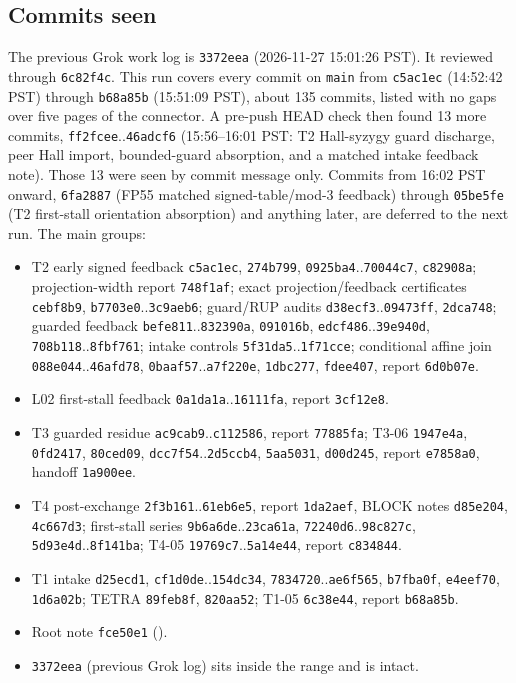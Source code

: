 \documentclass[11pt]{article}
\theoremstyle{definition}
\begin{document}
\subsection*{Commits seen}
The previous Grok work log is \texttt{3372eea} (2026-11-27 15:01:26 PST). It reviewed through \texttt{6c82f4c}. This run covers every commit on \texttt{main} from \texttt{c5ac1ec} (14:52:42 PST) through \texttt{b68a85b} (15:51:09 PST), about 135 commits, listed with no gaps over five pages of the connector. A pre-push HEAD check then found 13 more commits, \texttt{ff2fcee}..\texttt{46adcf6} (15:56--16:01 PST: T2 Hall-syzygy guard discharge, peer Hall import, bounded-guard absorption, and a matched intake feedback note). Those 13 were seen by commit message only. Commits from 16:02 PST onward, \texttt{6fa2887} (FP55 matched signed-table/mod-3 feedback) through \texttt{05be5fe} (T2 first-stall orientation absorption) and anything later, are deferred to the next run. The main groups:
\begin{itemize}
\item T2 early signed feedback \texttt{c5ac1ec}, \texttt{274b799}, \texttt{0925ba4}..\texttt{70044c7}, \texttt{c82908a}; projection-width report \texttt{748f1af}; exact projection/feedback certificates \texttt{cebf8b9}, \texttt{b7703e0}..\texttt{3c9aeb6}; guard/RUP audits \texttt{d38ecf3}..\texttt{09473ff}, \texttt{2dca748}; guarded feedback \texttt{befe811}..\texttt{832390a}, \texttt{091016b}, \texttt{edcf486}..\texttt{39e940d}, \texttt{708b118}..\texttt{8fbf761}; intake controls \texttt{5f31da5}..\texttt{1f71cce}; conditional affine join \texttt{088e044}..\texttt{46afd78}, \texttt{0baaf57}..\texttt{a7f220e}, \texttt{1dbc277}, \texttt{fdee407}, report \texttt{6d0b07e}.
\item L02 first-stall feedback \texttt{0a1da1a}..\texttt{16111fa}, report \texttt{3cf12e8}.
\item T3 guarded residue \texttt{ac9cab9}..\texttt{c112586}, report \texttt{77885fa}; T3-06 \texttt{1947e4a}, \texttt{0fd2417}, \texttt{80ced09}, \texttt{dcc7f54}..\texttt{2d5ccb4}, \texttt{5aa5031}, \texttt{d00d245}, report \texttt{e7858a0}, handoff \texttt{1a900ee}.
\item T4 post-exchange \texttt{2f3b161}..\texttt{61eb6e5}, report \texttt{1da2aef}, BLOCK notes \texttt{d85e204}, \texttt{4c667d3}; first-stall series \texttt{9b6a6de}..\texttt{23ca61a}, \texttt{72240d6}..\texttt{98c827c}, \texttt{5d93e4d}..\texttt{8f141ba}; T4-05 \texttt{19769c7}..\texttt{5a14e44}, report \texttt{c834844}.
\item T1 intake \texttt{d25ecd1}, \texttt{cf1d0de}..\texttt{154dc34}, \texttt{7834720}..\texttt{ae6f565}, \texttt{b7fba0f}, \texttt{e4eef70}, \texttt{1d6a02b}; TETRA \texttt{89feb8f}, \texttt{820aa52}; T1-05 \texttt{6c38e44}, report \texttt{b68a85b}.
\item Root note \texttt{fce50e1} ().
\item \texttt{3372eea} (previous Grok log) sits inside the range and is intact.
\end{itemize}
\end{document}
